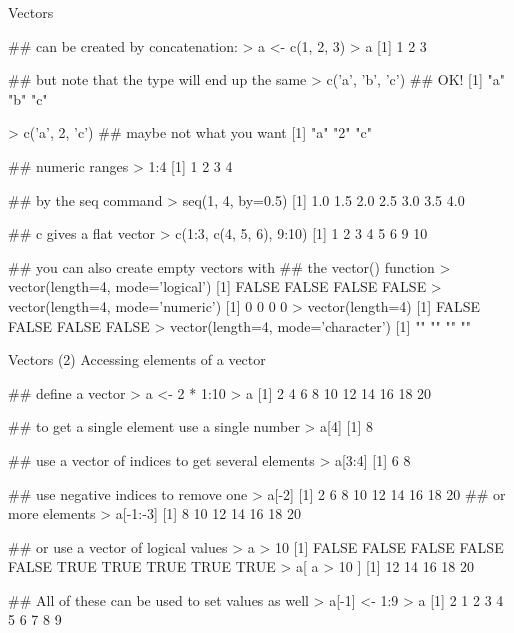 \documentclass[pdf]{beamer}
\begin{document}
\begin{frame}[fragile]{Vectors}
  \begin{rcode}
    ## can be created by concatenation:
    > a <- c(1, 2, 3)
    > a
    [1] 1 2 3
    
    ## but note that the type will end up the same
    > c('a', 'b', 'c')  ## OK!
    [1] "a" "b" "c"
    
    > c('a', 2, 'c') ## maybe not what you want
    [1] "a" "2" "c"
   
    ## numeric ranges
    > 1:4
    [1] 1 2 3 4

    ## by the seq command
    > seq(1, 4, by=0.5)
    [1] 1.0 1.5 2.0 2.5 3.0 3.5 4.0

    ## c gives a flat vector
    > c(1:3, c(4, 5, 6), 9:10)
    [1]  1  2  3  4  5  6  9 10

    ## you can also create empty vectors with
    ## the vector() function
    > vector(length=4, mode='logical')
    [1] FALSE FALSE FALSE FALSE
    > vector(length=4, mode='numeric')
    [1] 0 0 0 0
    > vector(length=4)
    [1] FALSE FALSE FALSE FALSE
    > vector(length=4, mode='character')
    [1] "" "" "" ""
  \end{rcode}
\end{frame}

\begin{frame}[fragile]{Vectors (2)}
Accessing elements of a vector

\begin{rcode}
  ## define a vector
  > a <- 2 * 1:10
  > a
  [1]  2  4  6  8 10 12 14 16 18 20

  ## to get a single element use a single number
  > a[4]
  [1] 8

  ## use a vector of indices to get several elements
  > a[3:4]
  [1] 6 8
  
  ## use negative indices to remove one
  > a[-2]
  [1]  2  6  8 10 12 14 16 18 20
  ## or more elements
  > a[-1:-3]
  [1]  8 10 12 14 16 18 20
  
  ## or use a vector of logical values
  > a > 10
  [1] FALSE FALSE FALSE FALSE FALSE  TRUE  TRUE  TRUE  TRUE  TRUE
  > a[ a > 10 ]
  [1] 12 14 16 18 20

  ## All of these can be used to set values as well
  > a[-1] <- 1:9
  > a
  [1] 2 1 2 3 4 5 6 7 8 9
\end{rcode}
\end{frame}
\end{document}
